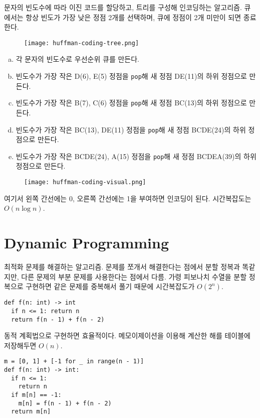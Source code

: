 문자의 빈도수에 따라 이진 코드를 할당하고, 트리를 구성해 인코딩하는 알고리즘. 큐에서는 항상 빈도가 가장 낮은 정점 2개를 선택하며, 큐에 정점이 2개 미만이 되면 종료한다.

\begin{figure}[h]
  \centering
  \texttt{[image: huffman-coding-tree.png]}
\end{figure}

\begin{enumerate}[(a)]
  \item 각 문자의 빈도수로 우선순위 큐를 만든다.
  \item 빈도수가 가장 작은 D(6), E(5) 정점을 \texttt{pop}해 새 정점 DE(11)의 하위 정점으로 만든다.
  \item 빈도수가 가장 작은 B(7), C(6) 정점을 \texttt{pop}해 새 정점 BC(13)의 하위 정점으로 만든다.
  \item 빈도수가 가장 작은 BC(13), DE(11) 정점을 \texttt{pop}해 새 정점 BCDE(24)의 하위 정점으로 만든다.
  \item 빈도수가 가장 작은 BCDE(24), A(15) 정점을 \texttt{pop}해 새 정점 BCDEA(39)의 하위 정점으로 만든다.
\end{enumerate}

\begin{figure}[h]
  \centering
  \texttt{[image: huffman-coding-visual.png]}
\end{figure}

여기서 왼쪽 간선에는 0, 오른쪽 간선에는 1을 부여하면 인코딩이 된다. 시간복잡도는 $O(n \log{n})$.

\section{Dynamic Programming}

최적화 문제를 해결하는 알고리즘. 문제를 쪼개서 해결한다는 점에서 분할 정복과 똑같지만, 다른 문제의 부분 문제를 사용한다는 점에서 다름. 가령 피보나치 수열을 분할 정복으로 구현하면 같은 문제를 중복해서 풀기 때문에 시간복잡도가 $O(2^n)$.

\begin{verbatim}
def f(n: int) -> int
  if n <= 1: return n
  return f(n - 1) + f(n - 2)
\end{verbatim}

동적 계획법으로 구현하면 효율적이다. 메모이제이션을 이용해 계산한 해를 테이블에 저장해두면 $O(n)$.

\begin{verbatim}
m = [0, 1] + [-1 for _ in range(n - 1)]
def f(n: int) -> int:
  if n <= 1:
    return n
  if m[n] == -1:
    m[n] = f(n - 1) + f(n - 2)
  return m[n]
\end{verbatim}

